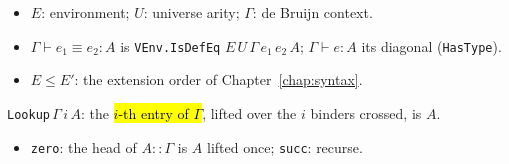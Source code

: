 \begin{itemize}
\item $E$: environment; $U$: universe arity; $\Gamma$: de Bruijn context.
\item $\Gamma \vdash e_1 \equiv e_2 : A$ is \texttt{VEnv.IsDefEq} $E\,U\,\Gamma\,e_1\,e_2\,A$;
  $\Gamma \vdash e : A$ its diagonal (\texttt{HasType}).
\item $E \le E'$: the extension order of Chapter~\ref{chap:syntax}.
\end{itemize}

\begin{definition}
\label{def:lookup}
\leanok
{}

 \texttt{Lookup}\,$\Gamma\,i\,A$: the \hl{$i$-th entry of $\Gamma$}, lifted
over the $i$ binders crossed, is $A$.
\begin{itemize}
\item \texttt{zero}: the head of $A :: \Gamma$ is $A$ lifted once; \texttt{succ}: recurse.
\end{itemize}
\end{definition}

